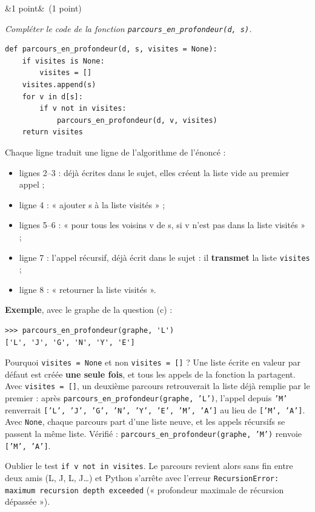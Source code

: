 \documentclass[11pt, a4paper]{exam}
\newcommand{\code}[1]{\texttt{#1}}
\newcommand{\Q}[3]{\par\needspace{5\baselineskip}\bigskip\noindent{\large\bfseries Question #1}\ifx&#2&\else\ \textnormal{(#2)}\fi\par\nopagebreak\smallskip\noindent\textit{#3}\par\nopagebreak\smallskip}
\begin{document}
\Q{3 (e)}{1 point}{Compléter le code de la fonction \code{parcours\_en\_profondeur(d, s)}.}
\begin{reponse}
\begin{lstlisting}
def parcours_en_profondeur(d, s, visites = None):
    if visites is None:
        visites = []
    visites.append(s)
    for v in d[s]:
        if v not in visites:
            parcours_en_profondeur(d, v, visites)
    return visites
\end{lstlisting}
\end{reponse}
Chaque ligne traduit une ligne de l'algorithme de l'énoncé :
\begin{itemize}
\item lignes 2--3 : déjà écrites dans le sujet, elles créent la liste vide au premier appel ;
\item ligne 4 : « ajouter s à la liste visités » ;
\item lignes 5--6 : « pour tous les voisins v de s, si v n'est pas dans la liste visités » ;
\item ligne 7 : l'appel récursif, déjà écrit dans le sujet : il \textbf{transmet} la liste \code{visites} ;
\item ligne 8 : « retourner la liste visités ».
\end{itemize}
\textbf{Exemple}, avec le graphe de la question (c) :
\begin{lstlisting}[numbers=none]
>>> parcours_en_profondeur(graphe, 'L')
['L', 'J', 'G', 'N', 'Y', 'E']
\end{lstlisting}
\begin{remarque}
Pourquoi \code{visites = None} et non \code{visites = []} ? Une liste écrite en valeur par défaut est créée \textbf{une seule fois}, et tous les appels de la fonction la partagent. Avec \code{visites = []}, un deuxième parcours retrouverait la liste déjà remplie par le premier : après \code{parcours\_en\_profondeur(graphe, 'L')}, l'appel depuis \code{'M'} renverrait \code{['L', 'J', 'G', 'N', 'Y', 'E', 'M', 'A']} au lieu de \code{['M', 'A']}. Avec \code{None}, chaque parcours part d'une liste neuve, et les appels récursifs se passent la même liste. Vérifié : \code{parcours\_en\_profondeur(graphe, 'M')} renvoie \code{['M', 'A']}.
\end{remarque}
\begin{erreur}
Oublier le test \code{if v not in visites}. Le parcours revient alors sans fin entre deux amis (L, J, L, J\ldots) et Python s'arrête avec l'erreur \code{RecursionError: maximum recursion depth exceeded} (« profondeur maximale de récursion dépassée »).
\end{erreur}
\end{document}
